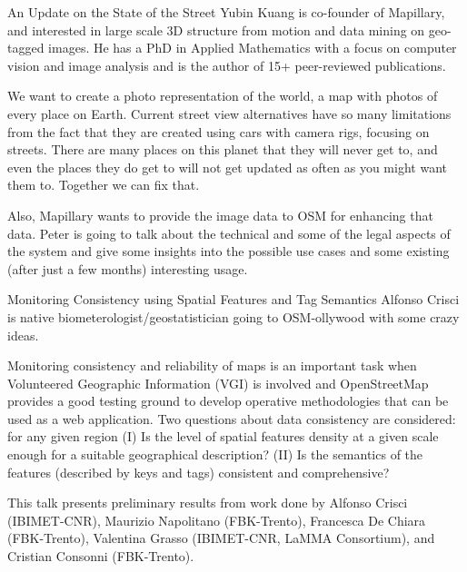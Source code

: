 %
{An Update on the State of the Street}%
{Yubin Kuang is co-founder of Mapillary, and interested in large scale 3D structure from motion and data mining on geo-tagged images. He has a PhD in Applied Mathematics with a focus on computer vision and image analysis and is the author of 15+ peer-reviewed publications.}%
{We want to create a photo representation of the world, a map with photos of every place on Earth. Current street view alternatives have so many limitations from the fact that they are created using cars with camera rigs, focusing on streets. There are many places on this planet that they will never get to, and even the places they do get to will not get updated as often as you might want them to. Together we can fix that. 

Also, Mapillary wants to provide the image data to OSM for enhancing that data. 
Peter is going to talk about the technical and some of the legal aspects of the system and give some insights into the possible use cases and some existing (after just a few months) interesting usage.}

%
{Monitoring Consistency using Spatial Features and Tag Semantics}%
{Alfonso Crisci is native biometerologist/geostatistician going to OSM-ollywood with some crazy ideas.}%
{Monitoring consistency and reliability of maps is an important task when Volunteered Geographic Information (VGI) is involved and OpenStreetMap provides a good testing ground to develop operative methodologies that can be used as a web application. Two questions about data consistency are considered: for any given region (I) Is the level of spatial features density at a given scale enough for a suitable geographical description? (II) Is the semantics of the features (described by keys and tags) consistent and comprehensive?

This talk presents preliminary results from work done by Alfonso Crisci (IBIMET-CNR), Maurizio Napolitano (FBK-Trento), Francesca De Chiara (FBK-Trento), Valentina Gras\-so (IBIMET-CNR, LaMMA Consortium), and Cristian Consonni (FBK-Trento).}

